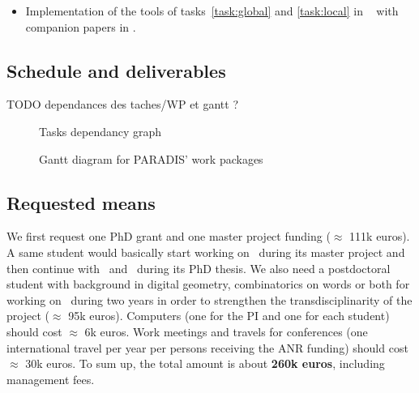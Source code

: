 \Success
\begin{itemize}
  \item Implementation of the tools of tasks~\ref{task:global} and \ref{task:local}
    in \DGtalTools~ with companion papers in \IPOL.
\end{itemize}


\subsection{Schedule and deliverables}
\label{sec:schedule}

TODO dependances des taches/WP et gantt ?

\begin{figure}[htbp]
  \centering
  
  \caption{Tasks dependancy graph}
  \label{fig:tasks}
\end{figure}


\begin{figure}[htbp]
  \centering
  
  \caption{Gantt diagram for PARADIS' work packages}
  \label{fig:gantt}
\end{figure}

\subsection{Requested means}
\label{sec:ressources}



We first request one PhD grant and one master project funding ($\approx$ 111k euros). A same student would basically start working on \wpPPA~during its master project and then continue with \wpEstim~and \wpScale~during its PhD thesis. We also need a postdoctoral student with background in digital geometry, combinatorics on words or both for working on \wpPattern~during two years in order to strengthen the transdisciplinarity of the project ($\approx$ 95k euros). 
Computers (one for the PI and one for each student) should cost $\approx$ 6k euros. Work meetings and travels for conferences (one international travel per year per persons receiving the ANR funding) should cost $\approx$ 30k euros. 
To sum up, the total amount is about \textbf{260k euros}, including management fees. 


